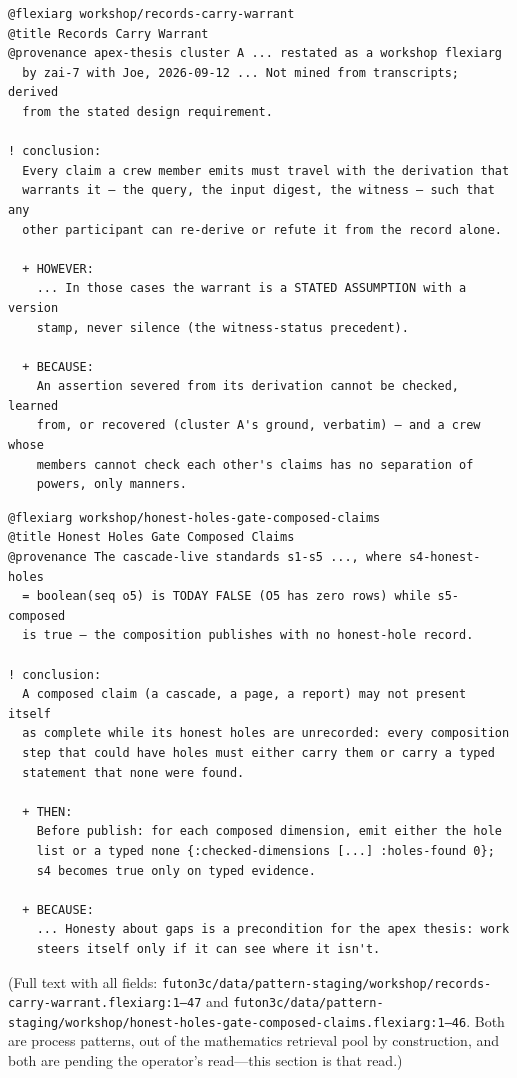 \begin{footnotesize}
\begin{verbatim}
@flexiarg workshop/records-carry-warrant
@title Records Carry Warrant
@provenance apex-thesis cluster A ... restated as a workshop flexiarg
  by zai-7 with Joe, 2026-09-12 ... Not mined from transcripts; derived
  from the stated design requirement.

! conclusion:
  Every claim a crew member emits must travel with the derivation that
  warrants it — the query, the input digest, the witness — such that any
  other participant can re-derive or refute it from the record alone.

  + HOWEVER:
    ... In those cases the warrant is a STATED ASSUMPTION with a version
    stamp, never silence (the witness-status precedent).

  + BECAUSE:
    An assertion severed from its derivation cannot be checked, learned
    from, or recovered (cluster A's ground, verbatim) — and a crew whose
    members cannot check each other's claims has no separation of
    powers, only manners.
\end{verbatim}
\end{footnotesize}

\begin{footnotesize}
\begin{verbatim}
@flexiarg workshop/honest-holes-gate-composed-claims
@title Honest Holes Gate Composed Claims
@provenance The cascade-live standards s1-s5 ..., where s4-honest-holes
  = boolean(seq o5) is TODAY FALSE (O5 has zero rows) while s5-composed
  is true — the composition publishes with no honest-hole record.

! conclusion:
  A composed claim (a cascade, a page, a report) may not present itself
  as complete while its honest holes are unrecorded: every composition
  step that could have holes must either carry them or carry a typed
  statement that none were found.

  + THEN:
    Before publish: for each composed dimension, emit either the hole
    list or a typed none {:checked-dimensions [...] :holes-found 0};
    s4 becomes true only on typed evidence.

  + BECAUSE:
    ... Honesty about gaps is a precondition for the apex thesis: work
    steers itself only if it can see where it isn't.
\end{verbatim}
\end{footnotesize}

(Full text with all fields:
\texttt{futon3c/data/pattern-staging/workshop/records-carry-warrant.flexiarg:1--47}
and
\texttt{futon3c/data/pattern-staging/workshop/honest-holes-gate-composed-claims.flexiarg:1--46}.
Both are process patterns, out of the mathematics retrieval pool by
construction, and both are pending the operator's read---this section is
that read.)

